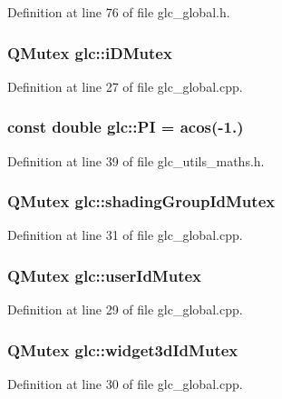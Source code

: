 Definition at line 76 of file glc\-\_\-global.\-h.

\hypertarget{namespaceglc_aea03de24834fa317d9f59314c51ecad5}{
\subsubsection[{i\-D\-Mutex}]{\setlength{\rightskip}{0pt plus 5cm}Q\-Mutex glc\-::i\-D\-Mutex}}\label{namespaceglc_aea03de24834fa317d9f59314c51ecad5}


Definition at line 27 of file glc\-\_\-global.\-cpp.

\hypertarget{namespaceglc_ad0f268df7555a0084f6f242e599a0572}{
\subsubsection[{P\-I}]{\setlength{\rightskip}{0pt plus 5cm}const {\bf double} glc\-::\-P\-I = acos(-\/1.)}}\label{namespaceglc_ad0f268df7555a0084f6f242e599a0572}


Definition at line 39 of file glc\-\_\-utils\-\_\-maths.\-h.

\hypertarget{namespaceglc_a84965f37a5e138508dcae5ab60c7b570}{
\subsubsection[{shading\-Group\-Id\-Mutex}]{\setlength{\rightskip}{0pt plus 5cm}Q\-Mutex glc\-::shading\-Group\-Id\-Mutex}}\label{namespaceglc_a84965f37a5e138508dcae5ab60c7b570}


Definition at line 31 of file glc\-\_\-global.\-cpp.

\hypertarget{namespaceglc_a64f61b5cd4c7600d481f8c4960c9cc4f}{
\subsubsection[{user\-Id\-Mutex}]{\setlength{\rightskip}{0pt plus 5cm}Q\-Mutex glc\-::user\-Id\-Mutex}}\label{namespaceglc_a64f61b5cd4c7600d481f8c4960c9cc4f}


Definition at line 29 of file glc\-\_\-global.\-cpp.

\hypertarget{namespaceglc_afd490963dc902de4f7bccd5e2a473f12}{
\subsubsection[{widget3d\-Id\-Mutex}]{\setlength{\rightskip}{0pt plus 5cm}Q\-Mutex glc\-::widget3d\-Id\-Mutex}}\label{namespaceglc_afd490963dc902de4f7bccd5e2a473f12}


Definition at line 30 of file glc\-\_\-global.\-cpp.

